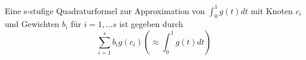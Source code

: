 \begin{comment}[Approximation von Integralen]
\begin{description}
  \item 
\end{description}
\begin{enumerate}
  \item (linke) Rechtecksregel: 
    $$\int_{x_{j-1}}^{x_{j-1}+h} f(x) dx \approx h f(x_{j-1})$$
    $$\int_a^b f(x) dx = \sum_{j=1}^n \int_{x_{j-1}}^{x_j} f(x)dx \approx \sum_{j=1}^n f(x_{j-1}) (x_j-x_{j-1})$$
  \item Mittelpunktsregel:
    $$\int_{x_{j}}^{x_{j}+h} f(x) dx \approx f\left(\frac{x_j+x_j+h}{2}\right)h$$
    $$\int_a^bf(x)dx \approx \sum_{j=1}^n f\left( \frac{x_{j-1} + x_j}{2}\right) (x_j - x_{j-1})$$
    Da mit Hilfe der Transformationsformel sich jedes Integral $\int_{x_{j-1}}^{x_j}$ auf ein Integral $\int_a^b$ transformieren lässt, betrachten wir ohne Einschränkungen Integrale von $0$ bis $1$. Nutze dazu die Abb. $[a, b] \rightarrow [x_{j-1}, x_j], t \mapsto x_{j-1} + t(x_j - x_{j-1})$.
    $$ \int_{x_{j-1}}^{x_j} f(x) dx = \int_0^1 \underbrace{f\left( x_{j-1} + t(x_j - x_{j-1})\right)}_{:= g_{j-1}(t)} (x_j - x_{j-1})dt = \int_0^1 g_{j-1}(t)(x_j-x_{j-1})dt$$
\end{enumerate}
\end{comment}

\begin{definition}[Quadraturformel]
Eine s-stufige Quadraturformel zur Approximation von $\int_0^1 g(t)dt$ mit Knoten $c_i$ und Gewichten $b_i$ für $i=1,...s$ ist gegeben durch 
$$\sum_{i=1}^s b_i g(c_i) \left( \approx \int_0^1 g(t) dt\right)$$

\end{definition}

